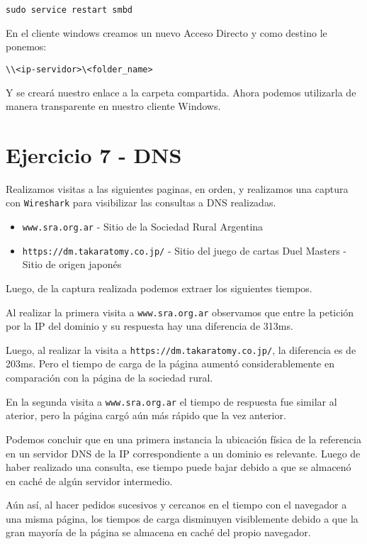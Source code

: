 \begin{lstlisting}
sudo service restart smbd
\end{lstlisting}

En el cliente windows creamos un nuevo Acceso Directo y como destino le ponemos:

\begin{lstlisting}
\\<ip-servidor>\<folder_name>
\end{lstlisting}

Y se creará nuestro enlace a la carpeta compartida. Ahora podemos utilizarla de manera transparente en nuestro cliente Windows.

\section{Ejercicio 7 - DNS}

Realizamos visitas a las siguientes paginas, en orden, y realizamos una captura con \texttt{Wireshark} para visibilizar las consultas a DNS realizadas.

\begin{itemize}
    \item \texttt{www.sra.org.ar} - Sitio de la Sociedad Rural Argentina
    \item \texttt{https://dm.takaratomy.co.jp/} - Sitio del juego de cartas Duel Masters - Sitio de origen japonés
\end{itemize}

Luego, de la captura realizada podemos extraer los siguientes tiempos.

Al realizar la primera visita a \texttt{www.sra.org.ar} observamos que entre la petición por la IP del dominio y su respuesta hay una diferencia de 313ms.

Luego, al realizar la visita a \texttt{https://dm.takaratomy.co.jp/}, la diferencia es de 203ms. Pero el tiempo de carga de la página aumentó considerablemente en comparación con la página de la sociedad rural.

En la segunda visita a \texttt{www.sra.org.ar} el tiempo de respuesta fue similar al aterior, pero la página cargó aún más rápido que la vez anterior.

Podemos concluir que en una primera instancia la ubicación física de la referencia en un servidor DNS de la IP correspondiente a un dominio es relevante. Luego de haber realizado una consulta, ese tiempo puede bajar debido a que se almacenó en caché de algún servidor intermedio. 

Aún así, al hacer pedidos sucesivos y cercanos en el tiempo con el navegador a una misma página, los tiempos de carga disminuyen visiblemente debido a que la gran mayoría de la página se almacena en caché del propio navegador.
\clearpage
\printbibliography


